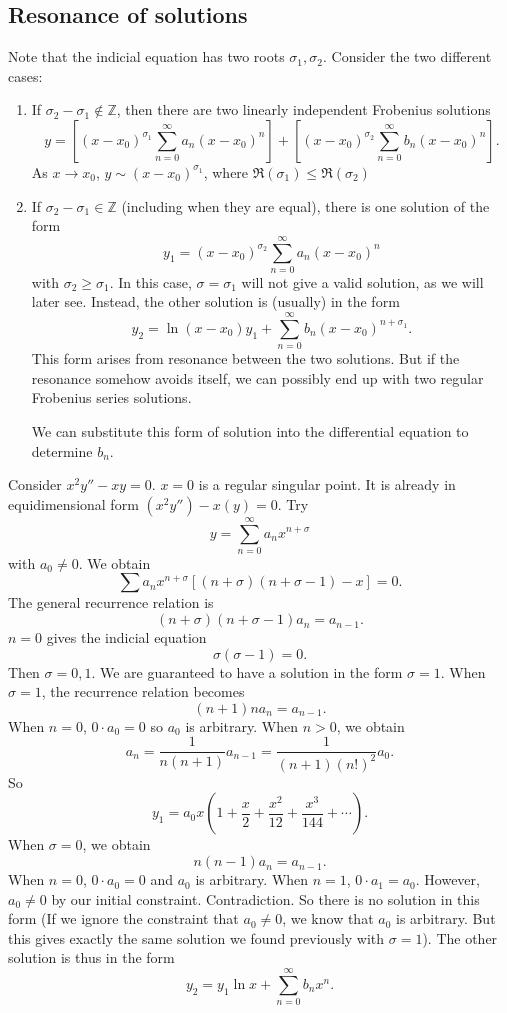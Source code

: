 \documentclass[a4paper]{article}
\begin{document}
\subsection{Resonance of solutions}
Note that the indicial equation has two roots $\sigma_1, \sigma_2$. Consider the two different cases:
\begin{enumerate}
  \item If $\sigma_2 - \sigma_1\notin\mathbb{Z}$, then there are two linearly independent Frobenius solutions
    \[
      y = \left[(x - x_0)^{\sigma_1}\sum_{n = 0}^{\infty} a_n(x - x_0)^n\right] + \left[(x - x_0)^{\sigma_2}\sum_{n = 0}^{\infty} b_n(x - x_0)^n\right].
    \]
    As $x\to x_0$, $y \sim (x - x_0)^{\sigma_1}$, where $\Re(\sigma_1) \leq \Re(\sigma_2)$

  \item If $\sigma_2 - \sigma_1\in\mathbb{Z}$ (including when they are equal), there is one solution of the form
    \[
      y_1 = (x - x_0)^{\sigma_2}\sum_{n = 0}^{\infty} a_n(x - x_0)^n
    \]
    with $\sigma_2 \geq \sigma_1$. In this case, $\sigma = \sigma_1$ will not give a valid solution, as we will later see. Instead, the other solution is (usually) in the form
    \[
      y_2 = \ln(x - x_0)y_1 + \sum_{n = 0}^\infty b_n(x - x_0)^{n + \sigma_1}.
    \]
    This form arises from resonance between the two solutions. But if the resonance somehow avoids itself, we can possibly end up with two regular Frobenius series solutions.

    We can substitute this form of solution into the differential equation to determine $b_n$.
\end{enumerate}
\begin{eg}
  Consider $x^2 y'' - xy = 0$. $x = 0$ is a regular singular point. It is already in equidimensional form $(x^2y'') - x(y) = 0$. Try
  \[
    y = \sum_{n = 0}^\infty a_n x^{n + \sigma}
  \]
  with $a_0 \not= 0$. We obtain
  \[
    \sum a_nx^{n + \sigma}[(n + \sigma)(n + \sigma - 1) - x] = 0.
  \]
  The general recurrence relation is
  \[
    (n + \sigma)(n + \sigma - 1)a_n = a_{n - 1}.
  \]
  $n = 0$ gives the indicial equation
  \[
    \sigma(\sigma - 1) = 0.
  \]
  Then $\sigma = 0, 1$. We are guaranteed to have a solution in the form $\sigma = 1$. When $\sigma = 1$, the recurrence relation becomes
  \[
    (n + 1)n a_n = a_{n - 1}.
  \]
  When $n = 0$, $0\cdot a_0 = 0$ so $a_0$ is arbitrary.
  When $n > 0$, we obtain
  \[
    a_n = \frac{1}{n(n +1)}a_{n - 1} = \frac{1}{(n + 1)(n!)^2}a_0.
  \]
  So
  \[
    y_1 = a_0x\left(1 + \frac{x}{2} + \frac{x^2}{12} + \frac{x^3}{144} + \cdots \right).
  \]
  When $\sigma = 0$, we obtain
  \[
    n(n - 1)a_n = a_{n - 1}.
  \]
  When $n = 0$, $0\cdot a_0 = 0$ and $a_0$ is arbitrary. When $n = 1$, $0\cdot a_1 = a_0$. However, $a_0\not= 0$ by our initial constraint. Contradiction. So there is no solution in this form (If we ignore the constraint that $a_0\not= 0$, we know that $a_0$ is arbitrary. But this gives exactly the same solution we found previously with $\sigma = 1$). The other solution is thus in the form
  \[
    y_2 = y_1\ln x + \sum_{n = 0}^\infty b_nx^n.
  \]
\end{eg}
\end{document}
